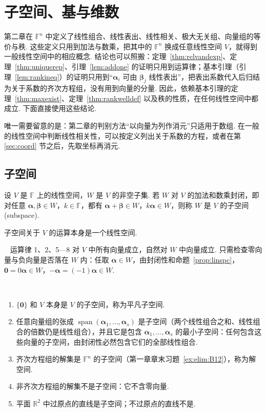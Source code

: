 \documentclass[lang=cn,10.5pt,scheme=chinese,toc=twocol,section,chinesefont=nofont,
twoside,citestyle=gb7714-2015,bibstyle=gb7714-2015]{elegantbook}
\DeclareRobustCommand{\textbf}[1]{{\lnsemiboldlatin\lnsemiboldcjk #1}}
\newcommand{\vv}[1]{\boldsymbol{#1}}
\newcommand{\zero}{\boldsymbol{0}}          %
\numberwithin{equation}{section}   %
\newcommand{\spn}{\operatorname{span}}      %
\newcommand*{\lnlabel}[1]{{\sffamily\bfseries\color{black}#1}}
\renewenvironment{example}[1][]{%
	\refstepcounter{exam}%
	\par\noindent\lnlabel{\examplename\ \theexam\ifblank{#1}{}{\ #1}}\ \rmfamily}{%
	\par\ignorespacesafterend}
\renewenvironment{proof}{%
	\par\noindent\lnlabel{\proofname}\;\ \color{black!90}\cfs}{\par}
\begin{document}
\section{子空间、基与维数}

第二章在 $\mathbb{F}^n$ 中定义了线性组合、线性表出、线性相关、极大无关组、向量组的等价与秩. 这些定义只用到加法与数乘，把其中的 $\mathbb{F}^n$ 换成任意线性空间 $V$，就得到一般线性空间中的相应概念. 结论也可以照搬：定理~\ref{thm:relvandexp}、定理~\ref{thm:uniquerep}、引理~\ref{lem:addone} 的证明只用到运算律；基本引理（引理~\ref{lem:rankineq}）的证明只用到“$\vv\alpha_i$ 可由 $\vv\beta_j$ 线性表出”，把表出系数代入后归结为关于系数的齐次方程组，没有用到向量的分量. 因此，依赖基本引理的定理~\ref{thm:maxexist}、定理~\ref{thm:rankwelldef} 以及秩的性质，在任何线性空间中都成立. 下面直接使用这些结论.

唯一需要留意的是：第二章的判别方法“以向量为列作消元”只适用于数组. 在一般的线性空间中判断线性相关性，可以按定义列出关于系数的方程，或者在第 \ref{sec:coord} 节之后，先取坐标再消元.

\subsection{子空间}
\begin{definition}
  设 $V$ 是 $\mathbb{F}$ 上的线性空间，$W$ 是 $V$ 的非空子集. 若 $W$ 对 $V$ 的加法和数乘封闭，即对任意 $\vv\alpha,\vv\beta\in W$，$k\in\mathbb{F}$，都有 $\vv\alpha+\vv\beta\in W$，$k\vv\alpha\in W$，则称 $W$ 是 $V$ 的\textbf{子空间}(subspace).
\end{definition}

\begin{proposition}
  子空间关于 $V$ 的运算本身是一个线性空间.
\end{proposition}
\begin{proof}
  运算律 1、2、5—8 对 $V$ 中所有向量成立，自然对 $W$ 中向量成立. 只需检查零向量与负向量是否落在 $W$ 内：任取 $\vv\alpha\in W$，由封闭性和命题~\ref{prop:linspc}，$\zero=0\vv\alpha\in W$，$-\vv\alpha=(-1)\vv\alpha\in W$.
\end{proof}

\begin{example}
  \begin{enumerate}
    \item $\{\zero\}$ 和 $V$ 本身是 $V$ 的子空间，称为平凡子空间.
    \item 任意向量组的张成 $\spn(\vv\alpha_1,\ldots,\vv\alpha_s)$ 是子空间（两个线性组合之和、线性组合的倍数仍是线性组合），并且它是包含 $\vv\alpha_1,\ldots,\vv\alpha_s$ 的\textbf{最小}子空间：任何包含这些向量的子空间，由封闭性必然包含它们的全部线性组合.
    \item 齐次方程组的解集是 $\mathbb{F}^n$ 的子空间（第一章章末习题~\ref{ex:elim:B12}），称为\textbf{解空间}.
    \item 非齐次方程组的解集\textbf{不是}子空间：它不含零向量.
    \item 平面 $\mathbb{R}^2$ 中过原点的直线是子空间；不过原点的直线不是.
  \end{enumerate}
\end{example}
\end{document}
